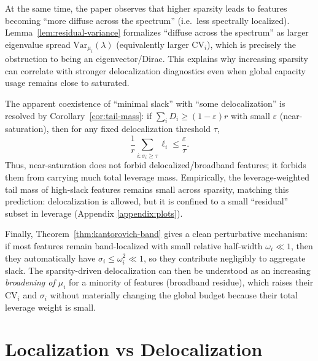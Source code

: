 \documentclass{article}
\theoremstyle{plain}
\numberwithin{equation}{section}
\theoremstyle{definition}
\theoremstyle{remark}
\begin{document}
At the same time, the paper observes that higher sparsity leads to features becoming “more diffuse across the spectrum”
(i.e.\ less spectrally localized). 
Lemma~\ref{lem:residual-variance} formalizes “diffuse across the spectrum” as larger eigenvalue spread
$\mathrm{Var}_{\mu_i}(\lambda)$ (equivalently larger $\mathrm{CV}_i$), which is precisely the obstruction to being an eigenvector/Dirac.
This explains why increasing sparsity can correlate with stronger delocalization diagnostics even when global capacity usage remains close to saturated.

The apparent coexistence of “minimal slack” with “some delocalization” is resolved by Corollary~\ref{cor:tail-mass}:
if $\sum_i D_i\ge (1-\varepsilon)r$ with small $\varepsilon$ (near-saturation), then for any fixed delocalization threshold $\tau$,
\[
\frac{1}{r}\sum_{i:\sigma_i\ge\tau}\ell_i \le \frac{\varepsilon}{\tau}.
\]
Thus, near-saturation does not forbid delocalized/broadband features; it forbids them from carrying much total leverage mass. Empirically, the leverage-weighted tail mass of high-slack features remains small across sparsity, matching this prediction: delocalization is allowed, but it is confined to a small “residual” subset in leverage (Appendix \ref{appendix:plots}). 

Finally, Theorem~\ref{thm:kantorovich-band} gives a clean perturbative mechanism: if most features remain band-localized
with small relative half-width $\omega_i\ll 1$, then they automatically have $\sigma_i\le \omega_i^2\ll 1$, so they contribute
negligibly to aggregate slack. The sparsity-driven delocalization can then be understood as an increasing \emph{broadening of $\mu_i$}
for a minority of features (broadband residue), which raises their $\mathrm{CV}_i$ and $\sigma_i$ without materially changing the
global budget because their total leverage weight is small.

\section{Localization vs Delocalization}
\label{appendix:localization_delocalization}
\end{document}
